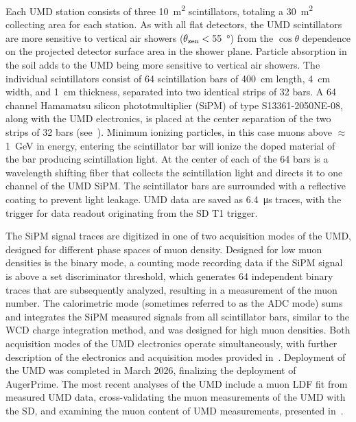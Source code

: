 Each UMD station consists of three \qty{10}{\meter^{2}} scintillators, totaling a \qty{30}{\meter^{2}} collecting area for each station.
As with all flat detectors, the UMD scintillators are more sensitive to vertical air showers ($\theta_{\rm zen}<\,$\qty{55}{\degree}) from the $\cos\theta$ dependence on the projected detector surface area in the shower plane.
Particle absorption in the soil adds to the UMD being more sensitive to vertical air showers.
The individual scintillators consist of 64 scintillation bars of \qty{400}{\centi\meter} length, \qty{4}{\centi\meter} width, and \qty{1}{\centi\meter} thickness, separated into two identical strips of 32 bars.
A 64 channel Hamamatsu silicon phototmultiplier (SiPM) of type S13361-2050NE-08, along with the UMD electronics, is placed at the center separation of the two strips of 32 bars (see~).
Minimum ionizing particles, in this case muons above $\approx\,$\qty{1}{\giga\electronvolt} in energy, entering the scintillator bar will ionize the doped material of the bar producing scintillation light.
At the center of each of the 64 bars is a wavelength shifting fiber that collects the scintillation light and directs it to one channel of the UMD SiPM.
The scintillator bars are surrounded with a reflective coating to prevent light leakage.
UMD data are saved as \qty{6.4}{\micro\second} traces, with the trigger for data readout originating from the SD T1 trigger.


The SiPM signal traces are digitized in one of two acquisition modes of the UMD, designed for different phase spaces of muon density.
Designed for low muon densities is the binary mode, a counting mode recording data if the SiPM signal is above a set discriminator threshold, which generates 64 independent binary traces that are subsequently analyzed, resulting in a measurement of the muon number.
The calorimetric mode (sometimes referred to as the ADC mode) sums and integrates the SiPM measured signals from all scintillator bars, similar to the WCD charge integration method, and was designed for high muon densities.
Both acquisition modes of the UMD electronics operate simultaneously, with further description of the electronics and acquisition modes provided in~\cite{auger_jinst2021_amigasipm}.
Deployment of the UMD was completed in March 2026, finalizing the deployment of AugerPrime.
The most recent analyses of the UMD include a muon LDF fit from measured UMD data, cross-validating the muon measurements of the UMD with the SD, and examining the muon content of UMD measurements, presented in~\cite{carminaperez_phd2026, joaquindejesus_phd2025, marinascornavacche_phd2025}.


